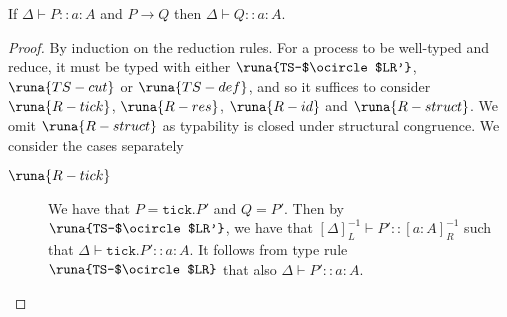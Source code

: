 \begin{theorem}
If $\Delta \vdash P :: a\!:\!A$ and $P \longrightarrow Q$ then $\Delta\vdash Q :: a\!:\!A$.
\begin{proof}
By induction on the reduction rules. For a process to be well-typed and reduce, it must be typed with either $\runa{TS-$\ocircle$LR'}$, $\runa{TS-cut}$ or $\runa{TS-def}$, and so it suffices to consider $\runa{R-tick}$, $\runa{R-res}$, $\runa{R-id}$ and $\runa{R-struct}$. We omit $\runa{R-struct}$ as typability is closed under structural congruence. We consider the cases separately
\begin{description}
\item[$\runa{R-tick}$] We have that $P=\texttt{tick}.P'$ and $Q = P'$. Then by $\runa{TS-$\ocircle$LR'}$, we have that $[\Delta]^{-1}_L \vdash P' :: [a:A]^{-1}_R$ such that $\Delta \vdash \texttt{tick}.P' :: a\!:\!A$. It follows from type rule $\runa{TS-$\ocircle$LR}$ that also $\Delta \vdash P' :: a\!:\!A$.


\end{description}
\end{proof}
\end{theorem}
